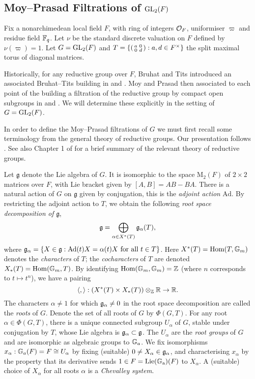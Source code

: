 \subsection{Moy--Prasad Filtrations of \texorpdfstring{$\mathrm{GL}_2(F)$}{TEXT}}

Fix a nonarchimedean local field $F$, with ring of integers $\mathcal{O}_F$, uniformiser $\varpi$ and residue field $\mathbb{F}_q$. Let $\nu$ be the standard discrete valuation on $F$ defined by $\nu(\varpi)=1$. Let $G=\mathrm{GL}_2(F)$ and $T=\left\{\begin{psmallmatrix}
    a&0\\0&d
\end{psmallmatrix} : a,d \in F^\times\right\}$ the split maximal torus of diagonal matrices.

Historically, for any reductive group over $F$, Bruhat and Tits introduced an associated Bruhat--Tits building in \cite{BT1} and \cite{BT2}. Moy and Prasad then associated to each point of the building a filtration of the reductive group by compact open subgroups in \cite{MP1} and \cite{MP2}. We will determine these explicitly in the setting of $G=\mathrm{GL}_2(F)$.

In order to define the Moy--Prasad filtrations of $G$ we must first recall some terminology from the general theory of reductive groups. Our presentation follows \cite{Fin1}. See also Chapter 1 of \cite{GH1} for a brief summary of the relevant theory of reductive groups.

Let $\mathfrak g$ denote the Lie algebra of $G$. It is isomorphic to the space $\mathrm{M}_2(F)$ of $2\times 2$ matrices over $F$, with Lie bracket given by $[A,B]=AB-BA$. There is a natural action of $G$ on $\mathfrak g$ given by conjugation, this is the \textit{adjoint action} $\mathrm{Ad}$. By restricting the adjoint action to $T$, we obtain the following \textit{root space decomposition of $\mathfrak g$},
$$\mathfrak{g} = \bigoplus\limits_{\alpha \in X^*(T)} \mathfrak{g}_\alpha(T),$$
where $\mathfrak{g}_\alpha = \{X \in \mathfrak{g} : \mathrm{Ad}(t)X = \alpha(t)X \text{ for all } t \in T\}$. Here $X^*(T) = \mathrm{Hom}(T,\mathbb{G}_m)$ denotes the \textit{characters} of $T$; the \textit{cocharacters} of $T$ are denoted $X_*(T) = \mathrm{Hom}(\mathbb{G}_m,T)$. By identifying $\mathrm{Hom}(\mathbb{G}_m, \mathbb{G}_m) = \mathbb{Z}$ (where $n$ corresponds to $t \mapsto t^n$), we have a pairing
$$\langle, \rangle : \left(X^*(T) \times X_*(T)\right) \otimes_{\mathbb{Z}} \mathbb{R} \to \mathbb{R}.$$ The characters $\alpha \neq 1$ for which $\mathfrak{g}_\alpha \neq 0$ in the root space decomposition are called the \textit{roots} of $G$. Denote the set of all roots of $G$ by $\Phi(G,T)$. For any root $\alpha \in \Phi(G,T)$, there is a unique connected subgroup $U_\alpha$ of $G$, stable under conjugation by $T$, whose Lie algebra is $\mathfrak{g}_\alpha \subset \mathfrak{g}$. The $U_\alpha$ are the \textit{root groups} of $G$ and are isomorphic as algebraic groups to $\mathbb{G}_a$. We fix isomorphisms $x_\alpha: \mathbb{G}_a(F)=F \cong U_\alpha$ by fixing (suitable) $0 \neq X_\alpha \in \mathfrak{g}_\alpha$, and characterising $x_\alpha$ by the property that its derivative sends $1 \in F=\mathrm{Lie(\mathbb{G}_a)}(F)$ to $X_\alpha$. A (suitable) choice of $X_\alpha$ for all roots $\alpha$ is a \textit{Chevalley system}. 

